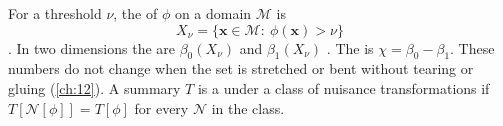 \begin{workdef}
For a threshold $\nu$, the  of $\phi$ on a domain
$\mathcal M$ is
\begin{equation}
  X_\nu=\{\mathbf x\in\mathcal M:\ \phi(\mathbf x)>\nu\}
  \label{0a:eq:excursion}
\end{equation}
. In two dimensions the 
are $\beta_0(X_\nu)$  and $\beta_1(X_\nu)$
. The
 is $\chi=\beta_0-\beta_1$. These numbers do
not change when the set is stretched or bent without tearing or gluing
(\cref{ch:12}). A summary $T$ is a  under a
class of nuisance transformations if $T[\mathcal N[\phi]]=T[\phi]$ for every
$\mathcal N$ in the class.
\end{workdef}

